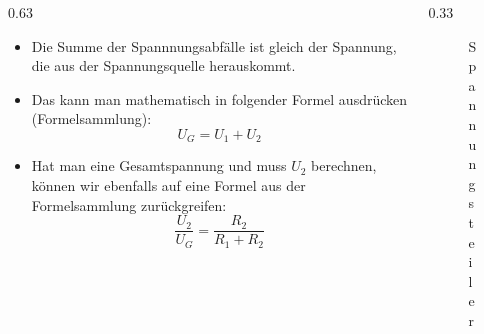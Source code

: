 \begin{frame}
\begin{columns}
    \begin{column}{0.63\textwidth}
    \begin{itemize}
  \item Die Summe der Spannnungsabfälle ist gleich der Spannung, die aus der Spannungsquelle herauskommt.
  \item Das kann man mathematisch in folgender Formel ausdrücken (Formelsammlung):
    $$U_{ G } = U_{ 1 } + U_{ 2 }$$
  \item Hat man eine Gesamtspannung und muss $U_{ 2 }$ berechnen, können wir ebenfalls auf eine Formel aus der Formelsammlung zurückgreifen:
    $$\dfrac{ U_{ 2 } }{ U_{ G } } = \dfrac{ R_{ 2 } }{ R_{ 1 } + R_{ 2 } }$$
  \end{itemize}


    \end{column}
   \begin{column}{0.33\textwidth}
       
\begin{figure}
    \caption{\scriptsize Spannungsteiler}
    \label{E 63. Spannungsteiler}
\end{figure}


   \end{column}
\end{columns}

\end{frame}

\begin{frame}
\end{frame}%
